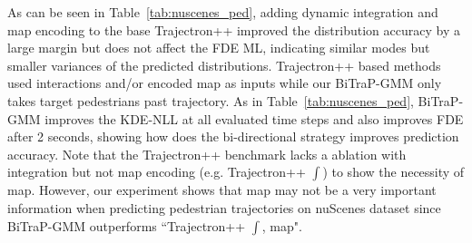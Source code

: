 \documentclass[letterpaper, 10 pt, conference]{ieeeconf}
\begin{document}
 As can be seen in Table~\ref{tab:nuscenes_ped}, adding dynamic integration and map encoding to the base Trajectron++ improved the distribution accuracy by a large margin but does not affect the FDE ML, indicating similar modes but smaller variances of the predicted distributions. Trajectron++ based methods used interactions and/or encoded map as inputs while our BiTraP-GMM only takes target pedestrians past trajectory. As in Table~\ref{tab:nuscenes_ped}, BiTraP-GMM improves the KDE-NLL at all evaluated time steps and also improves FDE after 2 seconds, showing how does the bi-directional strategy improves prediction accuracy. Note that the Trajectron++ benchmark lacks a ablation with integration but not map encoding (e.g. Trajectron++ $\int$) to show the necessity of map. However, our experiment shows that map may not be a very important information when predicting pedestrian trajectories on nuScenes dataset since BiTraP-GMM outperforms ``Trajectron++ $\int$, map".


 

\end{document}
